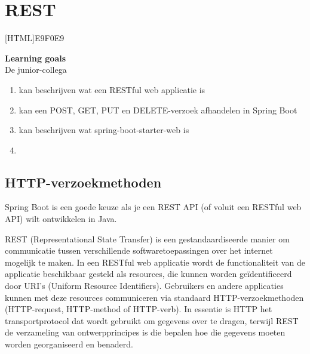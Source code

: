 \chapter{REST}

[HTML]{E9F0E9}{\parbox{\textwidth}{%
\noindent \textbf{Learning goals}\\
De junior-collega
\begin{enumerate}[nolistsep]
\item kan beschrijven wat een RESTful web applicatie is
\item kan een POST, GET, PUT en DELETE-verzoek afhandelen in Spring Boot
\item kan beschrijven wat spring-boot-starter-web is
\item 
\end{enumerate}}}

\section{HTTP-verzoekmethoden}

Spring Boot is een goede keuze als je een REST API (of voluit een RESTful web API) wilt ontwikkelen in Java.

REST (Representational State Transfer) is een gestandaardiseerde manier om communicatie tussen verschillende softwaretoepassingen over het internet mogelijk te maken. 
In een RESTful web applicatie wordt de functionaliteit van de applicatie beschikbaar gesteld als resources, die kunnen worden geïdentificeerd door URI's (Uniform Resource Identifiers).  Gebruikers en andere applicaties kunnen met deze resources communiceren via standaard HTTP-verzoekmethoden (HTTP-request, HTTP-method of HTTP-verb). In essentie is HTTP het transportprotocol dat wordt gebruikt om gegevens over te dragen,  terwijl REST de verzameling van ontwerpprincipes is die bepalen hoe die gegevens moeten worden georganiseerd en benaderd.

